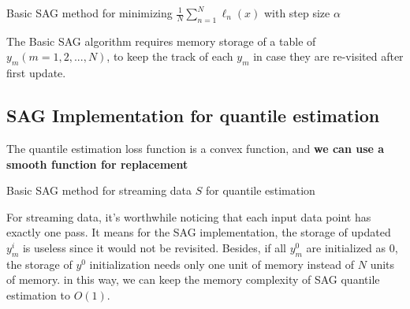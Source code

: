 \begin{algorithm}
    \caption{Basic SAG method for minimizing $\frac{1}{N} \sum^N_{n=1}\ell_n(x)$ with step size $\alpha$}\label{alg:SAG_ori}
        \begin{algorithmic}[1]
                       
                                    
            \EndFor
        \end{algorithmic}
\end{algorithm}

The Basic SAG algorithm requires memory storage of a table of $y_m (m= 1, 2, ...,N)$, to keep the track of each $y_m$ in case they are re-visited after first update.

\subsection{SAG Implementation for quantile estimation}

The quantile estimation loss function is a convex function, and \textbf{we can use a smooth function for replacement}
\begin{algorithm}
    \caption{Basic SAG method for streaming data $S$ for quantile estimation}\label{alg:SAG}
        \begin{algorithmic}[1]
                       
                 
            \EndFor
        \end{algorithmic}
\end{algorithm}
For streaming data, it's worthwhile noticing that each input data point has exactly one pass. It means for the SAG implementation, the storage of updated $y_m^i$ is useless since it would not be revisited. Besides, if all $y_m^0$ are initialized as 0, the storage of $y^0$ initialization needs only one unit of memory instead of $N$ units of memory. in this way, we can keep the memory complexity of SAG quantile estimation to $O(1)$.

